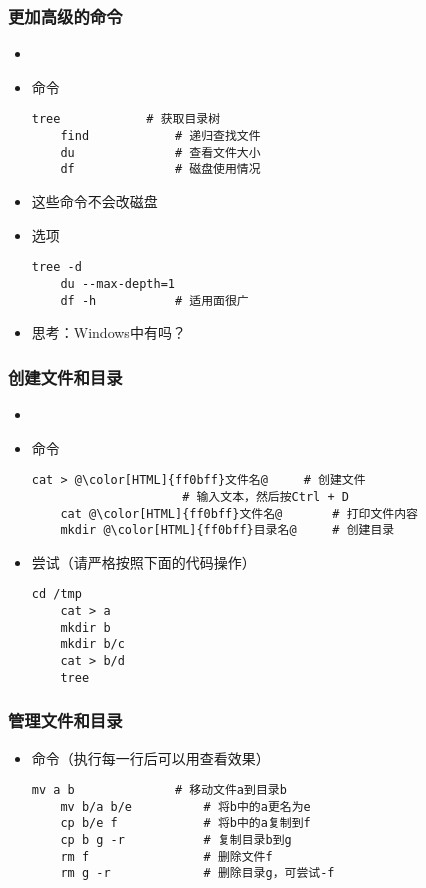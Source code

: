 \begin{CJK}{UTF8}{gbsn}
\begin{frame} [fragile]
	\frametitle{更加高级的命令}
	\begin{itemize}
	\item {}
	\item 命令
	\begin{lstlisting}[style=bashstyle, gobble=4, texcl]
	tree			# 获取目录树
	find			# 递归查找文件
	du				# 查看文件大小
	df				# 磁盘使用情况
	\end{lstlisting}
	\item 这些命令不会改磁盘
	\item 选项
	\begin{lstlisting}[style=bashstyle, gobble=4, texcl]
	tree -d
	du --max-depth=1
	df -h			# 适用面很广
	\end{lstlisting}
	\item 思考：Windows中有吗？
	\end{itemize}
\end{frame}

\begin{frame} [fragile]
	\frametitle{创建文件和目录}
	\begin{itemize}
	\item {}
	\item 命令
	\begin{lstlisting}[style=bashstyle, gobble=4, texcl, escapechar=@]
	cat > @\color[HTML]{ff0bff}文件名@		# 创建文件
					 # 输入文本，然后按Ctrl + D
	cat @\color[HTML]{ff0bff}文件名@		# 打印文件内容
	mkdir @\color[HTML]{ff0bff}目录名@		# 创建目录
	\end{lstlisting}
	\item 尝试（请严格按照下面的代码操作）
	\begin{lstlisting}[style=bashstyle, gobble=4, texcl]
	cd /tmp
	cat > a
	mkdir b
	mkdir b/c
	cat > b/d
	tree
	\end{lstlisting}
	\end{itemize}
\end{frame}

\begin{frame} [fragile]
	\frametitle{管理文件和目录}
	\linespread{1.25}
	\begin{itemize}
	\item 命令（执行每一行后可以用查看效果）
	\begin{lstlisting}[style=bashstyle, gobble=4, texcl]
	mv a b				# 移动文件a到目录b
	mv b/a b/e			# 将b中的a更名为e
	cp b/e f			# 将b中的a复制到f
	cp b g -r			# 复制目录b到g
	rm f				# 删除文件f
	rm g -r				# 删除目录g，可尝试-f
	\end{lstlisting}
	\end{itemize}
\end{frame}


\end{CJK}
